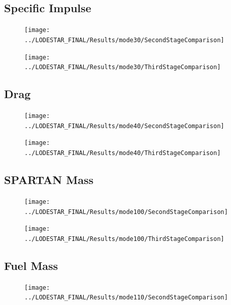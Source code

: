 \subsection{Specific Impulse}


\begin{figure}[!th]
\centering
\texttt{[image: ../LODESTAR\_FINAL/Results/mode30/SecondStageComparison]}
\caption{}
\label{fig:SecondStageComparison2}

\end{figure}
\begin{figure}[!th]
\centering
\texttt{[image: ../LODESTAR\_FINAL/Results/mode30/ThirdStageComparison]}
\caption{}
\label{fig:ThirdStageComparison2}
\end{figure}
\FloatBarrier
\subsection{Drag}

\begin{figure}[!th]
\centering
\texttt{[image: ../LODESTAR\_FINAL/Results/mode40/SecondStageComparison]}
\caption{}
\label{fig:SecondStageComparison3}
\end{figure}

\begin{figure}[!th]
\centering
\texttt{[image: ../LODESTAR\_FINAL/Results/mode40/ThirdStageComparison]}
\caption{}
\label{fig:ThirdStageComparison3}
\end{figure}
\FloatBarrier
\subsection{SPARTAN Mass}

\begin{figure}[th]
\centering
\texttt{[image: ../LODESTAR\_FINAL/Results/mode100/SecondStageComparison]}
\caption{}
\label{fig:SecondStageComparison4}
\end{figure}

\begin{figure}[th]
\centering
\texttt{[image: ../LODESTAR\_FINAL/Results/mode100/ThirdStageComparison]}
\caption{}
\label{fig:ThirdStageComparison4}
\end{figure}
\FloatBarrier
\subsection{Fuel Mass}
\begin{figure}[th]
\centering
\texttt{[image: ../LODESTAR\_FINAL/Results/mode110/SecondStageComparison]}
\caption{}
\label{fig:SecondStageComparison5}
\end{figure}

